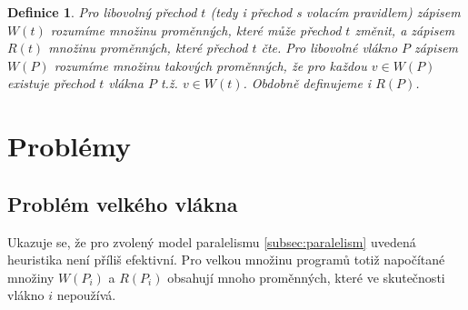 \documentclass{fithesis2}
\newtheorem{definition}{Definice}
\begin{document}



\begin{definition}
Pro libovolný přechod $t$ (tedy i přechod s volacím pravidlem) zápisem $W(t)$ rozumíme množinu proměnných, které může přechod $t$ změnit, a zápisem $R(t)$ množinu proměnných, které přechod $t$ čte. Pro libovolné vlákno $P$ zápisem $W(P)$ rozumíme množinu takových proměnných, že pro každou $v \in W(P)$ existuje přechod $t$ vlákna $P$ t.ž. $v \in W(t)$. Obdobně definujeme i $R(P)$.
\end{definition}

\section{Problémy}

\subsection{Problém velkého vlákna}
Ukazuje se, že pro zvolený model paralelismu \ref{subsec:paralelism} uvedená heuristika není příliš efektivní. Pro velkou množinu programů  totiž napočítané množiny $W(P_i)$ a $R(P_i)$ obsahují mnoho proměnných, které ve skutečnosti vlákno $i$ nepoužívá.
\end{document}
